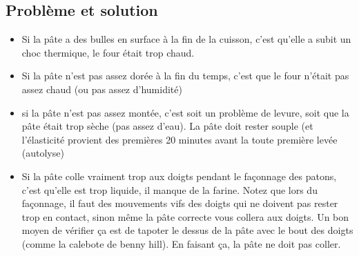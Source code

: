 \documentclass[a4paper,twoside,openright]{report}
\begin{document}
\subsection{Problème et solution}
\begin{itemize}
\item Si la pâte a des bulles en surface à la fin de la cuisson, c'est qu'elle a subit un choc thermique, le four était trop 
chaud. 
\item Si la pâte n'est pas assez dorée à la fin du temps, c'est que le four n'était pas assez chaud (ou pas assez d'humidité)
\item si la pâte n'est pas assez montée, c'est soit un problème de levure, soit que la pâte était trop sèche (pas assez d'eau). 
La pâte doit rester souple (et l'élasticité provient des premières 20 minutes avant la toute première levée (autolyse)
\item Si la pâte colle vraiment trop aux doigts pendant le façonnage des patons, c'est qu'elle est trop liquide, il manque de 
la farine. Notez que lors du façonnage, il faut des mouvements vifs des doigts qui ne doivent pas rester trop en contact, sinon 
même la pâte correcte vous collera aux doigts. Un bon moyen de vérifier ça est de tapoter le dessus de la pâte avec le bout des 
doigts (comme la calebote de benny hill). En faisant ça, la pâte ne doit pas coller. 
\end{itemize}
\end{document}
